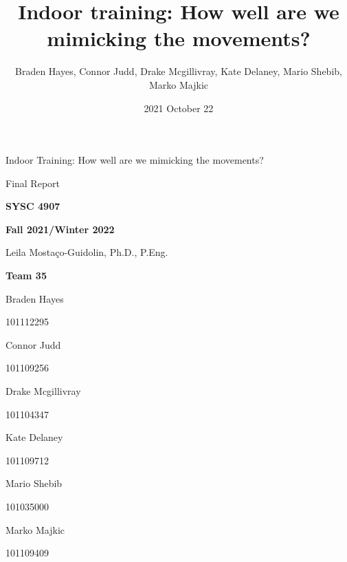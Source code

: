 \documentclass[11pt,letterpaper]{article}
\title{Indoor training: \newline How well are we mimicking the movements? }
\author{Braden Hayes, Connor Judd, Drake Mcgillivray, Kate Delaney, Mario Shebib, Marko Majkic}
\date{2021 October 22}
\begin{document}
\frenchspacing

\begin{titlepage}
\centering

{\Huge \sffamily Indoor Training: \newline How well are we mimicking the movements?}


{\Huge \sffamily Final Report}

{\large \textbf{SYSC 4907}}

{\large \textbf{Fall 2021/Winter 2022}}

Leila Mostaço-Guidolin, Ph.D., P.Eng.


{\large \textbf{Team 35}}

Braden Hayes

{\footnotesize 101112295}

Connor Judd

{\footnotesize 101109256}

Drake Mcgillivray

{\footnotesize 101104347}

Kate Delaney

{\footnotesize 101109712}

Mario Shebib

{\footnotesize 101035000}

Marko Majkic

{\footnotesize 101109409}


\end{titlepage}
\tableofcontents

\end{document}

